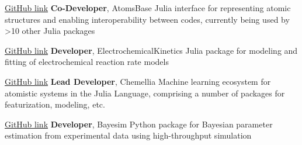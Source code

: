     {\href{https://github.com/https://github.com/JuliaMolSim/AtomsBase.jl}{GitHub link}}
    {\textbf{Co-Developer}, AtomsBase}
    {Julia interface for representing atomic structures and enabling interoperability between codes, currently being used by >10 other Julia packages}

    {\href{https://github.com/BattModels/ElectrochemicalKinetics.jl}{GitHub link}}
    {\textbf{Developer}, ElectrochemicalKinetics}
    {Julia package for modeling and fitting of electrochemical reaction rate models}

    {\href{https://github.com/Chemellia}{GitHub link}}
    {\textbf{Lead Developer}, Chemellia}
    {Machine learning ecosystem for atomistic systems in the Julia Language, comprising a number of packages for featurization, modeling, etc.}

    {\href{https://github.com/PV-Lab/bayesim}{GitHub link}}
    {\textbf{Developer}, Bayesim}
    {Python package for Bayesian parameter estimation from experimental data using high-throughput simulation}